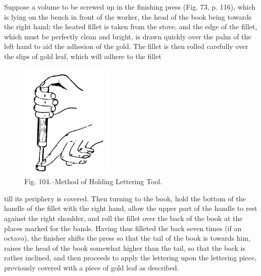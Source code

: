 \documentclass[twoside]{book}
\begin{document}
Suppose a volume to be screwed up in the finishing
press (Fig. 73, p. 116), which is lying on the bench
in front of the worker, the head of the book being
towards the right hand; the heated fillet is taken
from the stove, and the edge of the fillet, which
must be perfectly clean and bright, is drawn quickly
over the palm of the left hand to aid the adhesion
of the gold. The fillet is then rolled carefully over
the slips of gold leaf, which will adhere to the fillet
	\begin{figure}[h]
		\centering
		\includegraphics[width=0.4\textwidth]{Figures/_104.png}
		\caption*{Fig. 104.--Method of Holding Lettering Tool.}
	\end{figure}
till its periphery is covered. Then turning to the
book, hold the bottom of the handle of the fillet with
the right hand, allow the upper part of the handle to
rest against the right shoulder, and roll the fillet
over the back of the book at the places marked for
the bands. Having thus filleted the back seven
times (if an octavo), the finisher shifts the press so
that the tail of the book is towards him, raises the
head of the book somewhat higher than the tail, so
that the back is rather inclined, and then proceeds
to apply the lettering upon the lettering piece,
previously covered with a piece of gold leaf as
described.

\pagebreak
\end{document}
